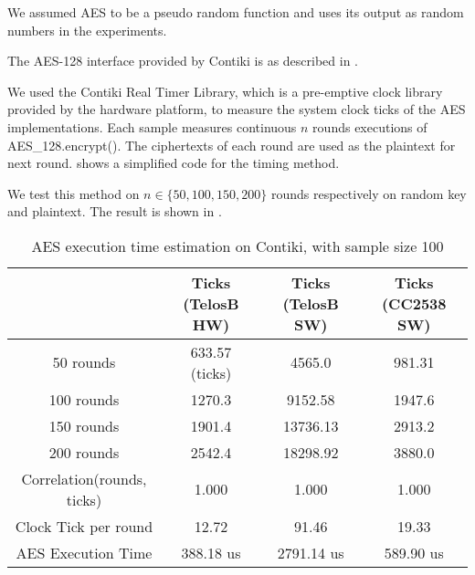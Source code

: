 We assumed AES to be a pseudo random function and uses its output as random numbers in the experiments.

The AES-128 interface provided by Contiki is as described in .

 

We used the Contiki Real Timer Library\cite{RTimer}, which is a pre-emptive clock library provided by the hardware platform, to measure the system clock ticks of the AES implementations. Each sample measures continuous $n$ rounds executions of AES\_128.encrypt(). The ciphertexts of each round are used as the plaintext for next round.
 shows a simplified code for the timing method.

 

We test this method on  $n \in \{ 50, 100, 150, 200\}$ rounds respectively on random key and plaintext. The result is shown in .

\begin{table}[ht!]
	\center
	\begin{tabular}{|c|c|c|c|}
	\hline
	                               & Ticks (TelosB HW) & Ticks (TelosB SW) & Ticks (CC2538 SW) \\ \hline
	50 rounds                      & 633.57 (ticks)                 & 4565.0                  & 981.31                  \\ \hline
	100 rounds                     & 1270.3                  & 9152.58                 & 1947.6                  \\ \hline
	150 rounds                     & 1901.4                  & 13736.13                & 2913.2                  \\ \hline
	200 rounds                     & 2542.4                  & 18298.92                & 3880.0                  \\ \hline
	Correlation(rounds, ticks)     & 1.000                   & 1.000                   & 1.000                   \\ \hline
        Clock Tick per round & 12.72                   & 91.46                   & 19.33                   \\ \hline
	AES Execution Time   & 388.18 us               & 2791.14 us              & 589.90 us               \\ \hline
	\end{tabular}
	\caption{AES execution time estimation on Contiki, with sample size 100}
	\label{Tbl: AES execution time estimation of Contiki}
\end{table}

